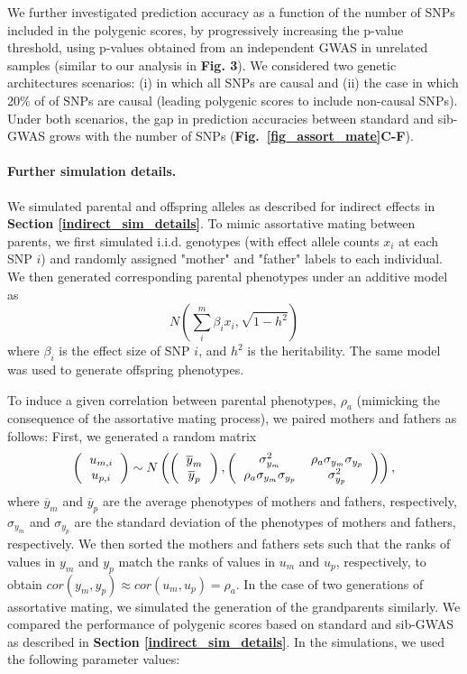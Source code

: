 \documentclass[hidelinks, 12pt]{article}
\begin{document}
We further investigated prediction accuracy as a function of the number of SNPs included in the polygenic scores, by progressively increasing the p-value threshold, using p-values obtained from an independent GWAS in unrelated samples (similar to our analysis in {\bf Fig. 3}). We considered two genetic architectures scenarios: (i) in which all SNPs are causal and (ii) the case in which 20\% of of SNPs are causal (leading polygenic scores to include non-causal SNPs). Under both scenarios, the gap in prediction accuracies between standard and sib-GWAS grows with the number of SNPs ({\bf Fig.~\ref{fig_assort_mate}C-F}).\\

\paragraph{Further simulation details.}
\label{assortative_sim_details} 
We simulated parental and offspring alleles as described for indirect effects in {\bf Section \ref{indirect_sim_details}}. To mimic assortative mating between parents, we first simulated i.i.d. genotypes (with effect allele counts $x_i$ at each SNP $i$) and randomly assigned "mother" and "father" labels to each individual. We then generated corresponding parental phenotypes under an additive model as
$$N(\sum_i^m\beta_ix_i,\sqrt{1-h^2})$$ where  $\beta_i$ is the effect size of SNP $i$, and $h^2$ is the heritability.  The same model was used to generate offspring phenotypes.

To induce a given correlation between parental phenotypes, $\rho_a$ (mimicking the consequence of the assortative mating process), we paired mothers and fathers as follows: First, we generated a random matrix  
\[ 
\left (
  \begin{tabular}{c}
  $u_{m,i}$ \\
  $u_{p,i}$
  \end{tabular}
\right ) \sim N
\left ( \left (
  \begin{tabular}{c}
  $\overline{y}_m$ \\
  $\overline{y}_p$
  \end{tabular}
\right ),
\left (
  \begin{tabular}{cc}
  $\sigma_{y_m}^2$ & $\rho_a \sigma_{y_m} \sigma_{y_p}$  \\
  $\rho_a \sigma_{y_m} \sigma_{y_p}$ & $\sigma_{y_p}^2$ 
  \end{tabular}
\right )\right ), 
\] where $\overline{y}_m$ and $\overline{y}_p$ are the average phenotypes of mothers and fathers, respectively, $\sigma_{y_m}$ and $\sigma_{y_p}$ are the standard deviation of the phenotypes of mothers and fathers, respectively.  We then sorted the mothers and fathers sets such that the ranks of values in $y_m$ and $y_p$ match the ranks of values in $u_m$ and $u_p$, respectively, to obtain $cor(y_m,y_p)\approx cor(u_m,u_p)=\rho_a$. In the case of two generations of assortative mating, we simulated the generation of the grandparents similarly.  We compared the performance of polygenic scores based on standard and sib-GWAS as described in {\bf Section \ref{indirect_sim_details}}.  In the simulations, we used the following parameter values:
\end{document}
